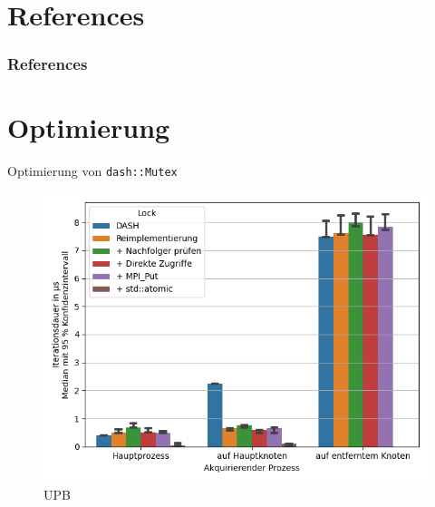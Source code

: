 \documentclass[fleqn,compress,utf8,aspectratio=169,t]{beamer}
\begin{document}
\appendix

\section{References}

\begin{frame}[allowframebreaks]
    \frametitle{References}
    \nocite{*}
    \printbibliography[heading=none]
\end{frame}

\section{Optimierung}

\begin{frame}{Optimierung von \texttt{dash::Mutex}}
    \begin{minipage}{.49\textwidth}
        \begin{figure}
            \includegraphics[width=\textwidth]{../../Dokumentation/Latex/Bilder/benchmarks/intelmpi/dash-optimization/UPB-lock_count=1000-latency}
            \caption{UPB}
        \end{figure}
    \end{minipage}
    \begin{minipage}{.49\textwidth}
        \begin{figure}

\end{figure}
\end{minipage}
\end{frame}
\end{document}
